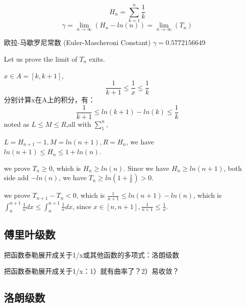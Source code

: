 \documentclass[UTF8]{../../09-Mathematics}
\begin{document}
$$
H_n = \sum_{k=1}^{n}\frac{1}{k}
$$
$$
\gamma = \lim_{n \rightarrow \infty}(H_n - ln(n))= \lim_{n \rightarrow \infty}(T_n)
$$

欧拉-马歇罗尼常数 (Euler-Mascheroni Constant) $\gamma = 0.5772156649$

Let us prove the limit of $T_n$ exits. 

$x\in A = [k,k+1]$, 
$$
\frac{1}{k+1} \leqslant\frac{1}{x} \leqslant\frac{1}{k} 
$$
 分别计算x在A上的积分，有：
$$
\frac{1}{k+1} \leqslant ln(k+1)-ln(k) \leqslant\frac{1}{k} 
$$
noted as $L \leqslant M \leqslant R$,all with $\sum_{1}^{n}$,

$L = H_{n+1}-1, M = ln(n+1), R = H_n$, we have $ln(n+1) \leqslant H_n \leqslant 1+ ln(n)$.

we prove $T_n \geqslant 0$, which is $H_n \geqslant ln(n)$. Since we have $H_n \geqslant ln(n+1)$, both side add $-ln(n)$, we have $T_n \geqslant  ln(1+ \frac{1}{n})>0$.

we prove $T_{n+1}- T_{n}<0$, which is $\frac{1}{n+1} \leqslant ln(n+1) - ln(n)$, which is $ \int_{n}^{n+1} \frac{1}{n}dx \leqslant \int_{n}^{n+1}\frac{1}{x}dx$, since  $x \in[n, n+1], \frac{1}{n+1} \leqslant \frac{1}{x}$.




\subsection{傅里叶级数}

把函数泰勒展开成关于1/x或其他函数的多项式：洛朗级数

把函数泰勒展开成关于1/x：1）就有曲率了？2）易收敛？

\subsection{洛朗级数}
\end{document}

